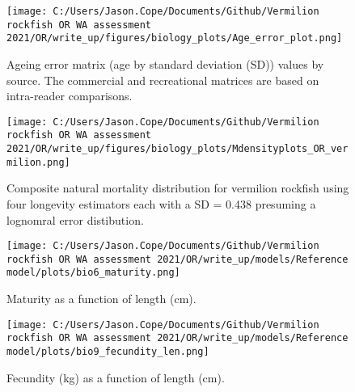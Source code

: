 \documentclass[11pt,
  english,
  a4paper,
]{article}
\begin{document}
\tagmcend\tagstructend


\begin{figure}
\centering
\texttt{[image: C:/Users/Jason.Cope/Documents/Github/Vermilion rockfish OR WA assessment 2021/OR/write\_up/figures/biology\_plots/Age\_error\_plot.png]}
\caption{Ageing error matrix (age by standard deviation (SD)) values by source. The commercial and recreational matrices are based on intra-reader comparisons.\label{fig:age-error}}
\end{figure}

\tagmcend\tagstructend


\begin{figure}
\centering
\texttt{[image: C:/Users/Jason.Cope/Documents/Github/Vermilion rockfish OR WA assessment 2021/OR/write\_up/figures/biology\_plots/Mdensityplots\_OR\_vermilion.png]}
\caption{Composite natural mortality distribution for vermilion rockfish using four longevity estimators each with a SD = 0.438 presuming a lognomral error distibution.\label{fig:M_composite_dists}}
\end{figure}

\tagmcend\tagstructend


\begin{figure}
\centering
\texttt{[image: C:/Users/Jason.Cope/Documents/Github/Vermilion rockfish OR WA assessment 2021/OR/write\_up/models/Reference model/plots/bio6\_maturity.png]}
\caption{Maturity as a function of length (cm).\label{fig:maturity}}
\end{figure}

\tagmcend\tagstructend


\begin{figure}
\centering
\texttt{[image: C:/Users/Jason.Cope/Documents/Github/Vermilion rockfish OR WA assessment 2021/OR/write\_up/models/Reference model/plots/bio9\_fecundity\_len.png]}
\caption{Fecundity (kg) as a function of length (cm).\label{fig:fecundity}}
\end{figure}
\end{document}
